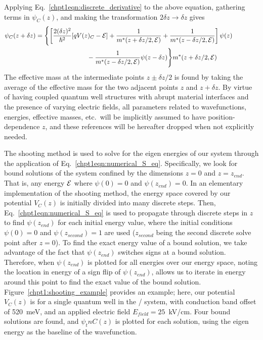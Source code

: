 \documentclass[12pt]{report}
\begin{document}
Applying Eq.~\eqref{chpt1eqn:discrete_derivative} to the above equation, gathering terms in $\psi_C(z)$, and making the transformation $2 \delta z \rightarrow \delta z$ gives
\begin{equation}
\label{chpt1eqn:numerical_S_eq}
\begin{split}
\psi_C(z+\delta z) &= \Biggl\{ \left[ \frac{2(\delta z)^2}{\hslash^2} [q V(z)_C-\EE]+\frac{1}{m^{*}(z+\delta z/2,\EE)}+\frac{1}{m^{*}(z-\delta z/2,\EE)} \right] \psi(z) \qquad \qquad\\
& \qquad \qquad \qquad \qquad  - \frac{1}{m^{*}(z-\delta z/2,\EE)} \psi(z-\delta z) \Biggr\} m^{*}(z+\delta z/2,\EE)
\end{split}
\end{equation}
The effective mass at the intermediate points $z\pm \delta z/2$ is found by taking the average of the effective mass for the two adjacent points $z$ and $z+\delta z$.  By virtue of having coupled quantum well structures with abrupt material interfaces and the presence of varying electric fields, all parameters related to wavefunctions, energies, effective masses, etc.\ will be implicitly assumed to have position-dependence $z$, and these references will be hereafter dropped when not explicitly needed.

The shooting method is used to solve for the eigen energies of our system through the application of Eq.~\eqref{chpt1eqn:numerical_S_eq}.  Specifically, we look for bound solutions of the system confined by the dimensions $z=0$ and $z=z_{end}$.  That is, any energy $\EE$ where $\psi(0)=0$ and $\psi(z_{end})=0$.  In an elementary implementation of the shooting method, the energy space covered by our potential $V_C(z)$ is initially divided into many discrete steps.  Then, Eq.~\eqref{chpt1eqn:numerical_S_eq} is used to propagate through discrete steps in $z$ to find $\psi(z_{end})$ for each initial energy value, where the initial conditions $\psi(0)=0$ and $\psi(z_{second})=1$  are used ($z_{second}$ being the second discrete solve point after $z=0$).  To find the exact energy value of a bound solution, we take advantage of the fact that $\psi(z_{end})$ switches signs at a bound solution.  Therefore, when $\psi(z_{end})$ is plotted for all energies over our energy space, noting the location in energy of a sign flip of $\psi(z_{end})$, allows us to iterate in energy around this point to find the exact value of the bound solution.  Figure~\ref{chpt1:shooting_example} provides an example; here, our potential $V_C(z)$ is for a single quantum well in the \InGaAs / \AlInAs system, with conduction band offset of 520~meV, and an applied electric field $E_{field}=25$~kV/cm.  Four bound solutions are found, and $\psi_tn{C}(z)$ is plotted for each solution, using the eigen energy as the baseline of the wavefunction.
\end{document}
